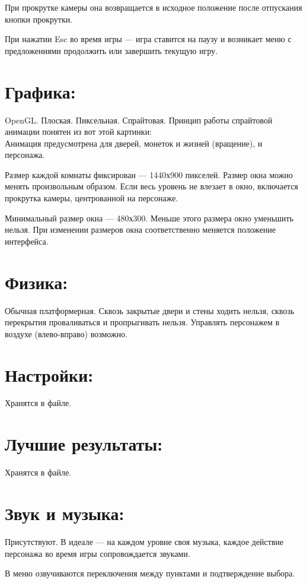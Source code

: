 \documentclass[12pt,a4paper]{article}
\begin{document}
При прокрутке камеры она возвращается в исходное положение после отпускания кнопки прокрутки.

При нажатии Esc во время игры --- игра ставится на паузу и возникает меню с предложениями продолжить или завершить текущую игру.
\section{Графика:}
OpenGL. Плоская. Пиксельная. Спрайтовая. Принцип работы спрайтовой анимации понятен из вот этой картинки:\\
Анимация предусмотрена для дверей, монеток и жизней (вращение), и персонажа.

Размер каждой комнаты фиксирован --- 1440х900 пикселей. Размер окна можно менять произвольным образом. Если весь уровень не влезает в окно, включается прокрутка камеры, центрованной на персонаже.

Минимальный размер окна --- 480х300. Меньше этого размера окно уменьшить нельзя. При изменении размеров окна соответственно меняется положение интерфейса.
\section{Физика:}
Обычная платформерная. Сквозь закрытые двери и стены ходить нельзя, сквозь перекрытия проваливаться и пропрыгивать нельзя. Управлять персонажем в воздухе (влево-вправо) возможно.
\section{Настройки:}
Хранятся в файле.
\section{Лучшие результаты:}
Хранятся в файле.
\section{Звук и музыка:}
Присутствуют. В идеале --- на каждом уровне своя музыка, каждое действие персонажа во время игры сопровождается звуками.

В меню озвучиваются переключения между пунктами и подтверждение выбора.
\end{document}
